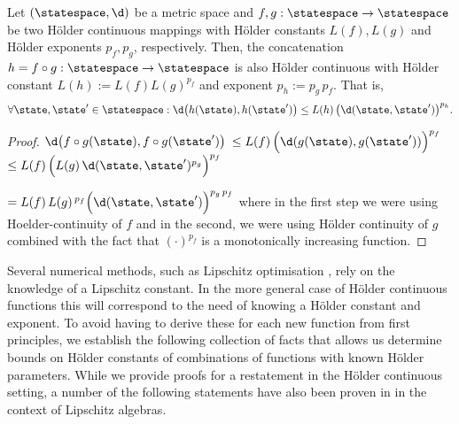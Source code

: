 \begin{thm} \label{thm:hoelderconcat}
Let $(\statespace, \d)$ be a metric space and $f,g : \statespace \to \statespace$ be two H\"older continuous mappings with H\"older constants $L(f), L(g)$ and H\"older exponents $p_f,p_g$, respectively.
Then, the concatenation $h=f \circ g: \statespace \to \statespace $ is also H\"older continuous with H\"older constant $L(h):= L(f) L(g)^{p_f}$ and exponent $p_h:=p_g \, p_f$.
That is, 
\[\forall \state,\state' \in \statespace: \d\bigl(h(\state),h(\state')\bigr) \leq L(h) \, \bigl(\d(\state,\state')\bigr)^{p_h}.\]
\begin{proof}
$\d\bigl(f \circ g(\state),f\circ g(\state')\bigr)$ $\leq L(f)\,  \Bigl(\d(g(\state),g(\state'))\Bigr)^{p_f}$
$\leq L(f)\,  \Bigl(L(g)\, \d(\state,\state')^{p_g}\Bigr)^{p_f}$ 

$= L(f)\, L(g)\,^{p_f}   \Bigl(\d(\state,\state')\Bigr)^{p_g\, p_f} $ where in the first step we were using Hoelder-continuity of $f$ and in the second, we were using H\"older continuity of $g$ combined with the fact that $(\cdot)^{p_f}$ is a monotonically increasing  function. 
\end{proof}
\end{thm} 



Several numerical methods, such as Lipschitz optimisation \cite{Shubert:72}, rely on the knowledge of a Lipschitz constant. In the more general case of H\"older continuous functions this will correspond to the need of knowing a H\"older constant and exponent. To avoid having to derive these for each new function from first principles, we establish the following collection of facts that allows us determine bounds on H\"older constants of combinations of functions with known H\"older parameters.
While we provide proofs for a restatement in the H\"older continuous setting, a number of the following statements have also been proven in \cite{Weaver1999} in the context of Lipschitz algebras.



